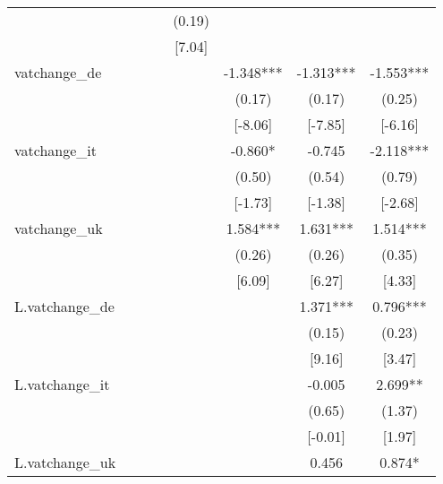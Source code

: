 \begin{table}
{\begin{tabular}{lccccccc}
			                   &           &           &           &  (0.19)   &           &           &           \\
			                   &           &           &           &  [7.04]   &           &           &           \\\hline
			vatchange\_de      &           &           &           &           & -1.348*** & -1.313*** & -1.553*** \\
			                   &           &           &           &           &  (0.17)   &  (0.17)   &  (0.25)   \\
			                   &           &           &           &           &  [-8.06]  &  [-7.85]  &  [-6.16]  \\
			vatchange\_it      &           &           &           &           &  -0.860*  &  -0.745   & -2.118*** \\
			                   &           &           &           &           &  (0.50)   &  (0.54)   &  (0.79)   \\
			                   &           &           &           &           &  [-1.73]  &  [-1.38]  &  [-2.68]  \\
			vatchange\_uk      &           &           &           &           & 1.584***  & 1.631***  & 1.514***  \\
			                   &           &           &           &           &  (0.26)   &  (0.26)   &  (0.35)   \\
			                   &           &           &           &           &  [6.09]   &  [6.27]   &  [4.33]   \\
			L.vatchange\_de    &           &           &           &           &           & 1.371***  & 0.796***  \\
			                   &           &           &           &           &           &  (0.15)   &  (0.23)   \\
			                   &           &           &           &           &           &  [9.16]   &  [3.47]   \\
			L.vatchange\_it    &           &           &           &           &           &  -0.005   &  2.699**  \\
			                   &           &           &           &           &           &  (0.65)   &  (1.37)   \\
			                   &           &           &           &           &           &  [-0.01]  &  [1.97]   \\
			L.vatchange\_uk    &           &           &           &           &           &   0.456   &  0.874*   \\

\end{tabular}}
\end{table}
